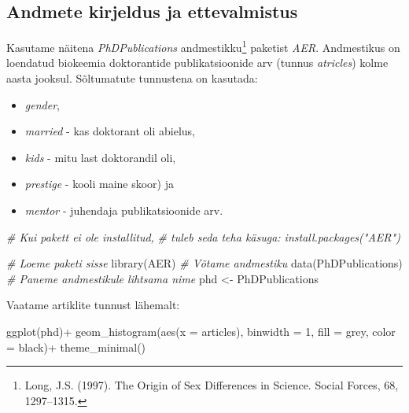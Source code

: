 \documentclass[
]{book}
\newenvironment{Shaded}{\begin{snugshade}}{\end{snugshade}}
\newcommand{\AttributeTok}[1]{\textcolor[rgb]{0.77,0.63,0.00}{#1}}
\newcommand{\CommentTok}[1]{\textcolor[rgb]{0.56,0.35,0.01}{\textit{#1}}}
\newcommand{\DecValTok}[1]{\textcolor[rgb]{0.00,0.00,0.81}{#1}}
\newcommand{\FunctionTok}[1]{\textcolor[rgb]{0.00,0.00,0.00}{#1}}
\newcommand{\NormalTok}[1]{#1}
\newcommand{\OtherTok}[1]{\textcolor[rgb]{0.56,0.35,0.01}{#1}}
\newcommand{\SpecialCharTok}[1]{\textcolor[rgb]{0.00,0.00,0.00}{#1}}
\newcommand{\StringTok}[1]{\textcolor[rgb]{0.31,0.60,0.02}{#1}}
\providecommand{\tightlist}{%
  \setlength{\itemsep}{0pt}\setlength{\parskip}{0pt}}
\begin{document}
\hypertarget{andmete-kirjeldus-ja-ettevalmistus}{%
\subsection{Andmete kirjeldus ja ettevalmistus}\label{andmete-kirjeldus-ja-ettevalmistus}}

Kasutame näitena \emph{PhDPublications} andmestikku\footnote{Long, J.S. (1997). The Origin of Sex Differences in Science. Social Forces, 68, 1297--1315.} paketist \emph{AER}. Andmestikus on loendatud biokeemia doktorantide publikatsioonide arv (tunnus \emph{atricles}) kolme aasta jooksul. Sõltumatute tunnustena on kasutada:

\begin{itemize}
\tightlist
\item
  \emph{gender},
\item
  \emph{married} - kas doktorant oli abielus,
\item
  \emph{kids} - mitu last doktorandil oli,
\item
  \emph{prestige} - kooli maine skoor) ja
\item
  \emph{mentor} - juhendaja publikatsioonide arv.
\end{itemize}

\begin{Shaded}
\begin{Highlighting}[]
\CommentTok{\# Kui pakett ei ole installitud, }
\CommentTok{\# tuleb seda teha käsuga: install.packages("AER")}

\CommentTok{\# Loeme paketi sisse}
\FunctionTok{library}\NormalTok{(AER)}
\CommentTok{\# Võtame andmestiku}
\FunctionTok{data}\NormalTok{(PhDPublications)}
\CommentTok{\# Paneme andmestikule lihtsama nime}
\NormalTok{phd }\OtherTok{\textless{}{-}}\NormalTok{ PhDPublications}
\end{Highlighting}
\end{Shaded}

Vaatame artiklite tunnust lähemalt:

\begin{Shaded}
\begin{Highlighting}[]
\FunctionTok{ggplot}\NormalTok{(phd)}\SpecialCharTok{+}
  \FunctionTok{geom\_histogram}\NormalTok{(}\FunctionTok{aes}\NormalTok{(}\AttributeTok{x =}\NormalTok{ articles), }
                 \AttributeTok{binwidth =} \DecValTok{1}\NormalTok{, }
                 \AttributeTok{fill =} \StringTok{\textquotesingle{}grey\textquotesingle{}}\NormalTok{, }
                 \AttributeTok{color =} \StringTok{\textquotesingle{}black\textquotesingle{}}\NormalTok{)}\SpecialCharTok{+}
  \FunctionTok{theme\_minimal}\NormalTok{()}
\end{Highlighting}
\end{Shaded}
\end{document}
